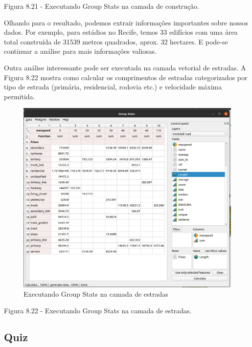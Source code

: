 \documentclass[
]{krantz}
\begin{document}
Figura 8.21 - Executando Group Stats na camada de construção.

Olhando para o resultado, podemos extrair informações importantes sobre nossos dados. Por exemplo, para estádios no Recife, temos 33 edifícios com uma área total construída de 31539 metros quadrados, aprox. 32 hectares. E pode-se continuar a análise para mais informações valiosas.

Outra análise interessante pode ser executada na camada vetorial de estradas. A Figura 8.22 mostra como calcular os comprimentos de estradas categorizados por tipo de estrada (primária, residencial, rodovia etc.) e velocidade máxima permitida.

\begin{figure}
\centering
\includegraphics{media/modulo8/fig822.png}
\caption{Executando Group Stats na camada de estradas}
\end{figure}

Figura 8.22 - Executando Group Stats na camada de estradas.

\hypertarget{quiz-18}{%
\subsection{Quiz}\label{quiz-18}}
\end{document}
